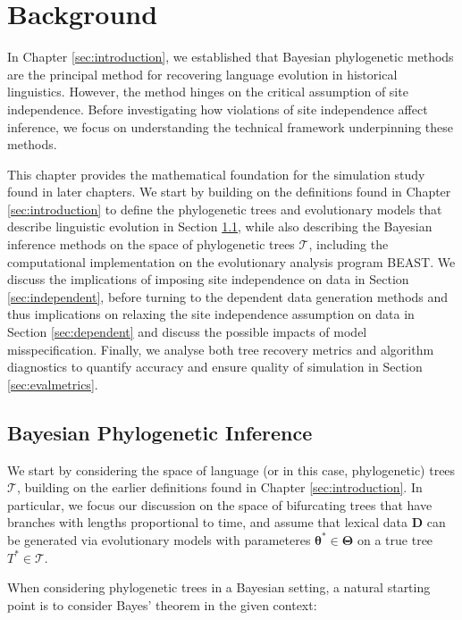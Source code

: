 \chapter{Background}
\label{sec:background}
In Chapter \ref{sec:introduction}, we established that Bayesian phylogenetic methods are the principal method for recovering language evolution in historical linguistics. However, the method hinges on the critical assumption of site independence. Before investigating how violations of site independence affect inference, we focus on understanding the technical framework underpinning these methods. 

This chapter provides the mathematical foundation for the simulation study found in later chapters. We start by building on the definitions found in Chapter \ref{sec:introduction} to define the phylogenetic trees and evolutionary models that describe linguistic evolution in Section \ref{sec:phylogenetictrees}, while also describing the Bayesian inference methods on the space of phylogenetic trees $\mathcal{T}$, including the computational implementation on the evolutionary analysis program BEAST. We discuss the implications of imposing site independence on data in Section \ref{sec:independent}, before turning to the dependent data generation methods and thus implications on relaxing the site independence assumption on data in Section \ref{sec:dependent} and discuss the possible impacts of model misspecification. Finally, we analyse both tree recovery metrics and algorithm diagnostics to quantify accuracy and ensure quality of simulation in Section \ref{sec:evalmetrics}. 

\section{Bayesian Phylogenetic Inference}
\label{sec:phylogenetictrees}
We start by considering the space of language (or in this case, phylogenetic) trees $\mathcal{T}$, building on the earlier definitions found in Chapter \ref{sec:introduction}. In particular, we focus our discussion on the space of bifurcating trees that have branches with lengths proportional to time, and assume that lexical data $\mathbf{D}$ can be generated via evolutionary models with parameteres $\boldsymbol{\theta}^* \in \boldsymbol{\Theta}$ on a true tree $T^* \in \mathcal{T}$.

When considering phylogenetic trees in a Bayesian setting, 
a natural starting point is to consider Bayes' theorem in the given context:

